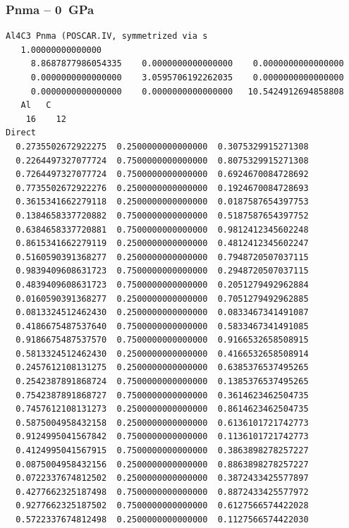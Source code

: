 \subsubsection*{Pnma -- 0~GPa}
\begin{footnotesize}
\begin{verbatim}
Al4C3 Pnma (POSCAR.IV, symmetrized via s
   1.00000000000000     
     8.8687877986054335    0.0000000000000000    0.0000000000000000
     0.0000000000000000    3.0595706192262035    0.0000000000000000
     0.0000000000000000    0.0000000000000000   10.5424912694858808
   Al   C 
    16    12
Direct
  0.2735502672922275  0.2500000000000000  0.3075329915271308
  0.2264497327077724  0.7500000000000000  0.8075329915271308
  0.7264497327077724  0.7500000000000000  0.6924670084728692
  0.7735502672922276  0.2500000000000000  0.1924670084728693
  0.3615341662279118  0.2500000000000000  0.0187587654397753
  0.1384658337720882  0.7500000000000000  0.5187587654397752
  0.6384658337720881  0.7500000000000000  0.9812412345602248
  0.8615341662279119  0.2500000000000000  0.4812412345602247
  0.5160590391368277  0.2500000000000000  0.7948720507037115
  0.9839409608631723  0.7500000000000000  0.2948720507037115
  0.4839409608631723  0.7500000000000000  0.2051279492962884
  0.0160590391368277  0.2500000000000000  0.7051279492962885
  0.0813324512462430  0.2500000000000000  0.0833467341491087
  0.4186675487537640  0.7500000000000000  0.5833467341491085
  0.9186675487537570  0.7500000000000000  0.9166532658508915
  0.5813324512462430  0.2500000000000000  0.4166532658508914
  0.2457612108131275  0.2500000000000000  0.6385376537495265
  0.2542387891868724  0.7500000000000000  0.1385376537495265
  0.7542387891868727  0.7500000000000000  0.3614623462504735
  0.7457612108131273  0.2500000000000000  0.8614623462504735
  0.5875004958432158  0.2500000000000000  0.6136101721742773
  0.9124995041567842  0.7500000000000000  0.1136101721742773
  0.4124995041567915  0.7500000000000000  0.3863898278257227
  0.0875004958432156  0.2500000000000000  0.8863898278257227
  0.0722337674812502  0.2500000000000000  0.3872433425577897
  0.4277662325187498  0.7500000000000000  0.8872433425577972
  0.9277662325187502  0.7500000000000000  0.6127566574422028
  0.5722337674812498  0.2500000000000000  0.1127566574422030
 

\end{verbatim}
\end{footnotesize}
